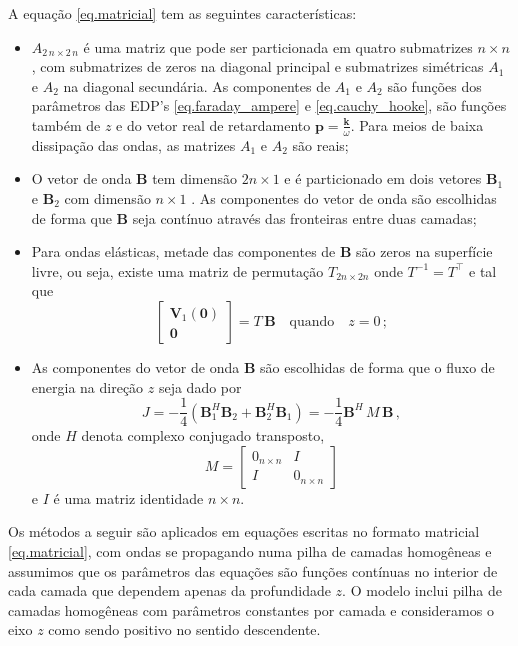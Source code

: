 A equação \ref{eq.matricial} tem as seguintes caracter\'isticas:
\begin{itemize}
\item $A_{2\,n\times2\,n}$ \'e uma matriz que pode ser particionada em quatro submatrizes $n\times n$, com submatrizes de zeros na diagonal principal e submatrizes sim\'etricas $A_1$ e $A_2$ na diagonal secund\'aria. As componentes de $A_1$ e $A_2$ s\~ao fun\c{c}\~oes dos par\^ametros das EDP's \ref{eq.faraday_ampere} e \ref{eq.cauchy_hooke}, s\~ao fun\c{c}\~oes tamb\'em de $z$ e do vetor real de retardamento $\mathbf{p}=\frac{\mathbf{k}}{\omega}$. Para meios de baixa dissipa\c{c}\~ao das ondas, as matrizes $A_1$ e $A_2$ s\~ao reais; 
\item O vetor de onda $\mathbf{B}$ tem dimens\~ao $2n\times1$ e \'e particionado em dois vetores $\mathbf{B}_1$ e $\mathbf{B}_2$ com dimens\~ao $n\times1$ . As componentes do vetor de onda s\~ao escolhidas de forma que $\mathbf{B}$ seja cont\'inuo atrav\'es das fronteiras entre duas camadas;
\item  Para ondas el\'asticas, metade das componentes de $\mathbf{B}$ s\~ao zeros na superf\'icie livre, ou seja, existe uma matriz de permuta\c{c}\~ao $T_{2n\times2n}$ onde $T^{-1}=T^\top$ e tal que
\begin{equation*}
\begin{bmatrix}
\mathbf{V}_1(\mathbf{0})\\
\mathbf{0}
\end{bmatrix}
=T\,\mathbf{B}\quad\text{quando}\quad z = 0\,;
\end{equation*}
\item As componentes do vetor de onda $\mathbf{B}$ s\~ao escolhidas de forma que o fluxo de energia na dire\c{c}\~ao $z$ seja dado por
\begin{equation*}
J=-\frac{1}{4}(\mathbf{B}_1^H\mathbf{B}_2+\mathbf{B}_2^H\mathbf{B}_1)=-\frac{1}{4}\mathbf{B}^H\,M\, \mathbf{B}\,,
\end{equation*}
onde $H$ denota complexo conjugado transposto,
\begin{equation*}
M=
\begin{bmatrix}
0_{n\times n}&I\\
I&0_{n\times n}
\end{bmatrix}
\end{equation*}
e $I$ \'e uma matriz identidade $n\times n$.
\end{itemize}

Os m\'etodos a seguir s\~ao aplicados em equa\c{c}\~oes escritas no formato matricial \ref{eq.matricial}, com ondas se propagando numa pilha de camadas homog\^eneas e assumimos que os par\^ametros das equa\c{c}\~oes s\~ao fun\c{c}\~oes cont\'inuas no interior de cada camada que dependem apenas da profundidade $z$. O modelo inclui pilha de camadas homog\^eneas com par\^ametros constantes por camada e consideramos o eixo $z$ como sendo positivo no sentido descendente.   

